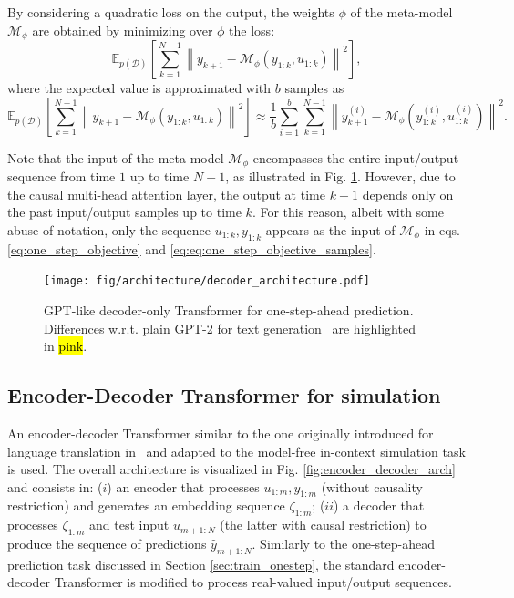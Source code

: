 \documentclass{article}
\newcommand{\free}{\mathcal{M}}
\newcommand{\D}{\mathcal{D}}
\newcommand{\nsamp}{N}
\newcommand{\norm}[1]{\left\lVert#1\right\rVert}
\newcommand{\E}{\mathbb{E}}
\begin{document}
By considering a quadratic loss on the output, the  weights $\phi$ of the meta-model $\free_{\phi}$ are obtained by minimizing over $\phi$ the loss:
\begin{equation}
	\label{eq:one_step_objective}
     \E_{p(\D)} 
    \left [ \sum_{k=1}^{\nsamp-1}
    \norm{y_{k+1} -
    \free_\phi (y_{1:k}, u_{1:k})
    }^2
    \right ],
\end{equation}
where the expected value is approximated with $b$ samples as
\begin{equation}
	\label{eq:eq:one_step_objective_samples}
\E_{p(\D)} 
    \left [ \sum_{k=1}^{\nsamp-1}
    \norm{y_{k+1} -
    \free_\phi (y_{1:k}, u_{1:k})
    }^2
    \right ]
    \approx \frac{1}{b}
    \sum_{i=1}^b
    \sum_{k=1}^{\nsamp-1}
    \norm{y_{k+1}^{(i)} -
    \free_\phi (y^{(i)}_{1:k}, u_{1:k}^{(i)})}^2
    .
\end{equation}

Note that the input of the meta-model $\free_\phi$ encompasses the entire input/output sequence from time $1$ up to time $N-1$, as illustrated in Fig. \ref{fig:decoder_only_arch}. However, due to the causal multi-head attention layer, the output at time $k+1$ depends only on the past input/output samples up to time $k$. For this reason, albeit with some abuse of notation, only the sequence $u_{1:k}, y_{1:k}$ appears as the input of $\free_\phi$ in eqs. \eqref{eq:one_step_objective} and \eqref{eq:eq:one_step_objective_samples}.



\begin{figure}[!bt]
\texttt{[image: fig/architecture/decoder\_architecture.pdf]}
\caption{GPT-like decoder-only Transformer   for one-step-ahead prediction. Differences w.r.t. plain GPT-2 for text generation~\cite{radford2019language, nanoGPT} are highlighted in \hl{pink}.}
\label{fig:decoder_only_arch}
\end{figure}


\subsection{Encoder-Decoder Transformer for simulation}
\label{sec:train_sim}
An encoder-decoder Transformer similar to the one originally introduced for language translation in~\cite{vaswani2017attention} and adapted to the model-free in-context simulation task is used. The overall architecture is visualized in Fig. \ref{fig:encoder_decoder_arch} and consists in: ($i$) an encoder that processes 
$u_{1:m}, y_{1:m}$ (without causality restriction) and generates an embedding sequence $\zeta_{1:{m}}$; ($ii$) a decoder  that processes $\zeta_{1:{m}}$ and test input  $u_{m+1:\nsamp}$ (the latter with causal restriction) to produce the 
sequence of predictions $\hat y_{m+1:\nsamp}$.
Similarly to the one-step-ahead prediction task discussed in Section \ref{sec:train_onestep}, the standard encoder-decoder Transformer is modified to process  real-valued input/output sequences. 
\end{document}
